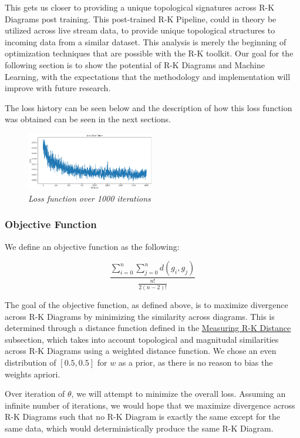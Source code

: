 This gets us closer to providing a unique topological signatures across R-K Diagrams post training. This post-trained R-K Pipeline, could in theory be utilized across live stream data, to provide unique topological structures to incoming data from a similar dataset. This analysis is merely the beginning of optimization techniques that are possible with the R-K toolkit. Our goal for the following section is to show the potential of R-K Diagrams and Machine Learning, with the expectations that the methodology and implementation will improve with future research.

The loss history can be seen below and the description of how this loss function was obtained can be seen in the next sections.

\begin{figure}[H]
	\centering
        \includegraphics[width=0.5\textwidth]{images/loss_over_time.png}
	\caption{\textit{Loss function over 1000 iterations}}
	\label{fig:loss_func}
\end{figure}

\subsubsection{Objective Function}
\label{sec:ObjectiveFunction}

We define an objective function as the following:

\begin{equation}
\frac{\sum^{n}_{i=0}\sum^{n}_{j=0}d(g_{i}, g_{j})}{ \frac{n!}{2(n-2)!}}
\end{equation}

The goal of the objective function, as defined above, is to maximize divergence across R-K Diagrams by minimizing the similarity across diagrams. This is determined through a distance function defined in the \hyperref[sec:rk_distance]{Measuring R-K Distance} subsection, which takes into account topological and magnitudal similarities across R-K Diagrams using a weighted distance function. We chose an even distribution of $[0.5, 0.5]$ for $w$ as a prior, as there is no reason to bias the weights apriori.

Over iteration of $\theta$, we will attempt to minimize the overall loss. Assuming an infinite number of iterations, we would hope that we maximize divergence across R-K Diagrams such that no R-K Diagram is exactly the same except for the same data, which would deterministically produce the same R-K Diagram.

